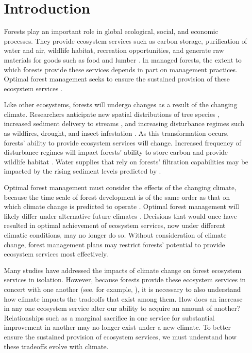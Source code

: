 
\section{Introduction}
 
Forests play an important role in global ecological, social, and economic processes. They provide ecosystem services such as carbon storage, purification of water and air, wildlife habitat, recreation opportunities, and generate raw materials for goods such as food and lumber \cite{daily1997ecosystem}. In managed forests, the extent to which forests provide these services depends in part on management practices. Optimal forest management seeks to ensure the sustained provision of these ecosystem services \cite{cfrForestMgmt}.

Like other ecosystems, forests will undergo changes as a result of the changing climate. Researchers anticipate new spatial distributions of tree species \cite{iverson1998predicting}, increased sediment delivery to streams \cite{Goode20121}, and increasing disturbance regimes such as wildfires, drought, and insect infestation \cite{vose2012effects}. As this transformation occurs, forests' ability to provide ecosystem services will change. Increased frequency of disturbance regimes will impact forests' ability to store carbon \cite{bonan2008forests} and provide wildlife habitat \cite{mckenzie2004climatic}. Water supplies that rely on forests' filtration capabilities may be impacted by the rising sediment levels predicted by \cite{Goode20121}.

Optimal forest management must consider the effects of the changing climate, because the time scale of forest development is of the same order as that on which climate change is predicted to operate \cite{ipcc2013climate}. Optimal forest management will likely differ under alternative future climates \cite{linder2000developing}. Decisions that would once have resulted in optimal achievement of ecosystem services, now under different climatic conditions, may no longer do so. Without consideration of climate change, forest management plans may restrict forests' potential to provide ecosystem services most effectively.

Many studies have addressed the impacts of climate change on forest ecosystem services in isolation\cite{vose2012effects}\cite{bonan2008forests}\cite{mckenzie2004climatic}. However, because forests provide these ecosystem services in concert with one another (see, for example, \cite{toth2009finding}), it is necessary to also understand how climate impacts the tradeoffs that exist among them. How does an increase in any one ecosystem service alter our ability to acquire an amount of another? Relationships such as a marginal sacrifice in one service for substantial improvement in another may no longer exist under a new climate. To better ensure the sustained provision of ecosystem services, we must understand how these tradeoffs evolve with climate.

